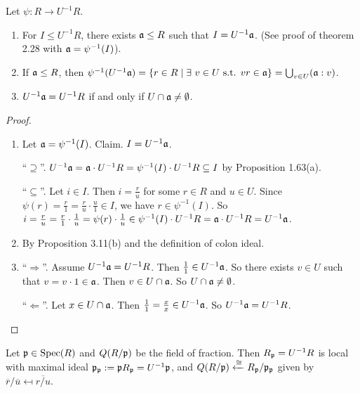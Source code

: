 \begin{proposition}
    Let $\psi: R \to U^{-1}R$.
    \begin{enumerate}
        \item For $I \leq U^{-1}R$, there exists $\mathfrak{a} \leq R$ such that $I = U^{-1}\mathfrak{a}$. (See proof of theorem 2.28 with $\mathfrak{a} = \psi^{-1}(I)$).
        \item If $\mathfrak{a} \leq R$, then $\psi^{-1}(U^{-1}\mathfrak{a}) =\{r \in R \mid \exists \  v \in U \text{ s.t. }v r \in \mathfrak{a}\} = \bigcup_{v \in U} (\mathfrak{a}:v)$.
        \item $U^{-1}\mathfrak{a} = U^{-1}R$ if and only if $U \cap \mathfrak{a} \neq \emptyset$.
    \end{enumerate}
\end{proposition}

\begin{proof}
    \begin{enumerate}
        \item Let $\mathfrak{a} = \psi^{-1}(I)$. Claim. $I = U^{-1} \mathfrak{a}$. \par 
            ``$\supseteq$''. $U^{-1}\mathfrak{a} = \mathfrak{a} \cdot U^{-1}R = \psi^{-1}(I) \cdot U^{-1}R \subseteq I$ by Proposition 1.63(a). \par 
            ``$\subseteq$''. Let $i \in I$. Then $i = \frac{r}{u}$ for some $r \in R$ and $u \in U$. Since $\psi(r) = \frac{r}{1} = \frac{r}{u} \cdot \frac{u}{1} \in I$, we have $r \in \psi^{-1}(I)$. So $i = \frac{r}{u} = \frac{r}{1} \cdot \frac{1}{u} = \psi(r) \cdot \frac{1}{u} \in \psi^{-1}(I) \cdot U^{-1}R = \mathfrak{a} \cdot U^{-1}R = U^{-1}\mathfrak{a}$.
        \item  By Proposition 3.11(b) and the definition of colon ideal.
        \item
            ``$\Rightarrow$''. Assume $U^{-1}\mathfrak{a} = U^{-1}R$. Then $\frac{1}{1} \in U^{-1}\mathfrak{a}$. So there exists $v \in U$ such that $v = v \cdot 1 \in \mathfrak{a}$. Then $v \in U \cap \mathfrak{a}$. So $U \cap \mathfrak{a} \neq \emptyset$. \par 
            ``$\Leftarrow$''. Let $x \in U \cap \mathfrak{a}$. Then $\frac{1}{1} = \frac{x}{x} \in U^{-1}\mathfrak{a}$. So $U^{-1}\mathfrak{a} = U^{-1}R$. \qedhere
    \end{enumerate}
\end{proof}

\begin{corollary}
    Let $\mathfrak{p} \in \operatorname{Spec}(R)$ and $Q(R/\mathfrak{p})$ be the field of fraction. Then $R_{\mathfrak{p}} = U^{-1}R$ is local with maximal ideal $\mathfrak{p}_{\mathfrak{p}} := \mathfrak{p} R_{\mathfrak{p}} = U^{-1}\mathfrak{p}$, and $Q(R/\mathfrak{p}) \xleftarrow \cong R_{\mathfrak{p}}/\mathfrak{p}_{\mathfrak{p}}$ given by $\overbar r / \overbar u \mapsfrom \overbar {r/u}$.
\end{corollary}

